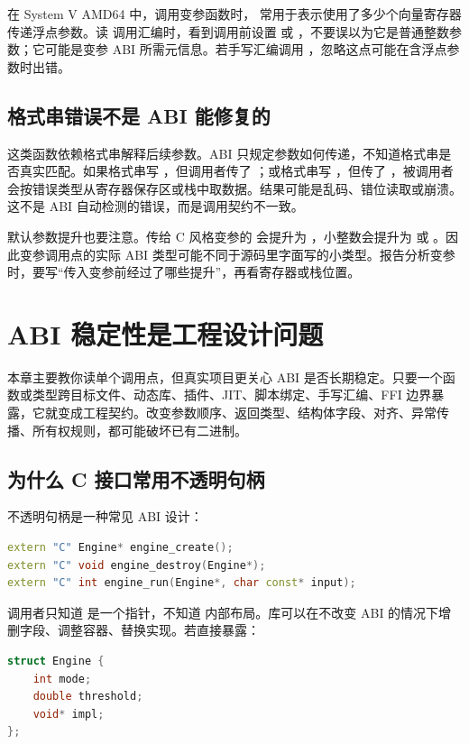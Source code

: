 在 System V AMD64 中，调用变参函数时， 常用于表示使用了多少个向量寄存器传递浮点参数。读  调用汇编时，看到调用前设置  或 ，不要误以为它是普通整数参数；它可能是变参 ABI 所需元信息。若手写汇编调用 ，忽略这点可能在含浮点参数时出错。

\subsection{格式串错误不是 ABI 能修复的}

 这类函数依赖格式串解释后续参数。ABI 只规定参数如何传递，不知道格式串是否真实匹配。如果格式串写 ，但调用者传了 ；或格式串写 ，但传了 ，被调用者会按错误类型从寄存器保存区或栈中取数据。结果可能是乱码、错位读取或崩溃。这不是 ABI 自动检测的错误，而是调用契约不一致。

默认参数提升也要注意。传给 C 风格变参的  会提升为 ，小整数会提升为  或 。因此变参调用点的实际 ABI 类型可能不同于源码里字面写的小类型。报告分析变参时，要写“传入变参前经过了哪些提升”，再看寄存器或栈位置。

\section{ABI 稳定性是工程设计问题}

本章主要教你读单个调用点，但真实项目更关心 ABI 是否长期稳定。只要一个函数或类型跨目标文件、动态库、插件、JIT、脚本绑定、手写汇编、FFI 边界暴露，它就变成工程契约。改变参数顺序、返回类型、结构体字段、对齐、异常传播、所有权规则，都可能破坏已有二进制。

\subsection{为什么 C 接口常用不透明句柄}

不透明句柄是一种常见 ABI 设计：

\begin{lstlisting}[language=C++]
extern "C" Engine* engine_create();
extern "C" void engine_destroy(Engine*);
extern "C" int engine_run(Engine*, char const* input);
\end{lstlisting}

调用者只知道  是一个指针，不知道  内部布局。库可以在不改变 ABI 的情况下增删字段、调整容器、替换实现。若直接暴露：

\begin{lstlisting}[language=C++]
struct Engine {
    int mode;
    double threshold;
    void* impl;
};
\end{lstlisting}

